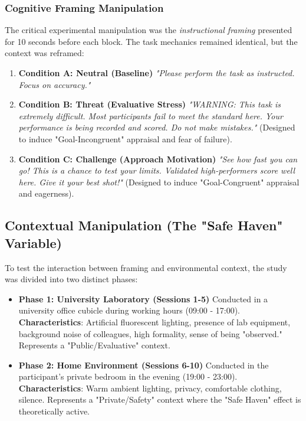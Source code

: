 \subsubsection{Cognitive Framing Manipulation}
The critical experimental manipulation was the \textit{instructional framing} presented for 10 seconds before each block. The task mechanics remained identical, but the context was reframed:

\begin{enumerate}
    \item \textbf{Condition A: Neutral (Baseline)}
    \textit{"Please perform the task as instructed. Focus on accuracy."}
    \item \textbf{Condition B: Threat (Evaluative Stress)}
    \textit{"WARNING: This task is extremely difficult. Most participants fail to meet the standard here. Your performance is being recorded and scored. Do not make mistakes."}
    (Designed to induce "Goal-Incongruent" appraisal and fear of failure).
    \item \textbf{Condition C: Challenge (Approach Motivation)}
    \textit{"See how fast you can go! This is a chance to test your limits. Validated high-performers score well here. Give it your best shot!"}
    (Designed to induce "Goal-Congruent" appraisal and eagerness).
\end{enumerate}

\subsection{Contextual Manipulation (The "Safe Haven" Variable)}
To test the interaction between framing and environmental context, the study was divided into two distinct phases:

\begin{itemize}
    \item \textbf{Phase 1: University Laboratory (Sessions 1-5)}
    Conducted in a university office cubicle during working hours (09:00 - 17:00).
    \textbf{Characteristics}: Artificial fluorescent lighting, presence of lab equipment, background noise of colleagues, high formality, sense of being "observed." Represents a "Public/Evaluative" context.
    
    \item \textbf{Phase 2: Home Environment (Sessions 6-10)}
    Conducted in the participant's private bedroom in the evening (19:00 - 23:00).
    \textbf{Characteristics}: Warm ambient lighting, privacy, comfortable clothing, silence. Represents a "Private/Safety" context where the "Safe Haven" effect is theoretically active.
\end{itemize}

